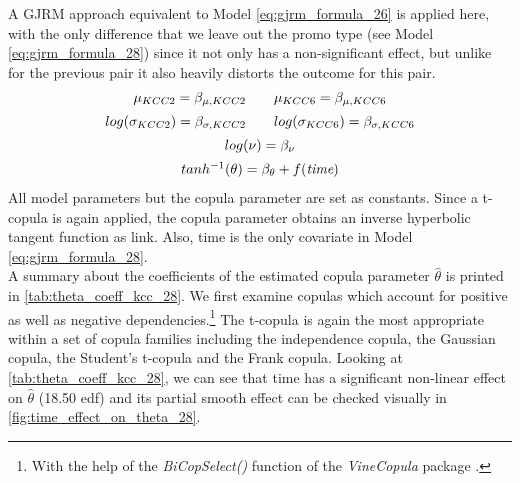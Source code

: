 A \ac{GJRM} approach equivalent to Model \ref{eq:gjrm_formula_26} is applied here, with the only difference that we leave out the promo type (see Model \ref{eq:gjrm_formula_28}) since it not only has a non-significant effect, but unlike for the previous pair it also heavily distorts the outcome for this pair. 
\begin{equation}
\begin{array}{c}
\mu_{KCC 2}=\beta_{\mu,KCC2} \qquad \mu_{KCC 6}=\beta_{\mu,KCC6}  \\  \noalign{\vskip5pt}

log(\sigma_{KCC 2})=\beta_{\sigma,KCC2} \qquad log(\sigma_{KCC 6})=\beta_{\sigma,KCC6} \\  \noalign{\vskip5pt}

log(\nu) = \beta_{\nu} \\  \noalign{\vskip5pt}

tanh^{-1}(\theta)=\beta_{\theta}  +f(\textit{time})
\end{array}
\label{eq:gjrm_formula_28}
\end{equation} 
All model parameters but the copula parameter are set as constants. Since a t-copula is again applied, the copula parameter obtains an inverse hyperbolic tangent function as link. Also, time is the only covariate in Model \ref{eq:gjrm_formula_28}. \\
A summary about the coefficients of the estimated copula parameter $\hat{\theta}$ is printed in \autoref{tab:theta_coeff_kcc_28}.  We first examine copulas which account for positive as well as negative dependencies.\footnote{With the help of the \textit{BiCopSelect()} function of the \textit{VineCopula} package \citep{nagler2019vinecopula}.} The t-copula is again the most appropriate within a set of copula families including the independence copula, the Gaussian copula, the Student's t-copula and the Frank copula. Looking at \autoref{tab:theta_coeff_kcc_28}, we can see that time has a significant non-linear effect on $\hat{\theta}$ (18.50 edf) and its partial smooth effect can be checked visually in \autoref{fig:time_effect_on_theta_28}.
\\



